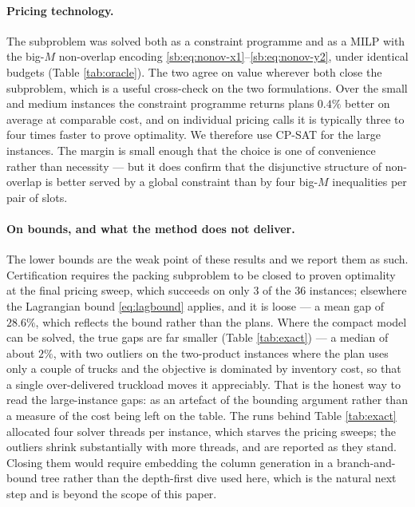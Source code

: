 \paragraph{Pricing technology.}
The subproblem was solved both as a constraint programme and as a MILP
with the big-$M$ non-overlap encoding
\eqref{sb:eq:nonov-x1}--\eqref{sb:eq:nonov-y2}, under identical
budgets (Table \ref{tab:oracle}). The two agree on value wherever both
close the subproblem, which is a useful cross-check on the two
formulations. Over the small and medium instances the constraint
programme returns plans $0.4\%$ better on average at comparable cost,
and on individual pricing calls it is typically three to four times
faster to prove optimality. We therefore use CP-SAT for the large
instances. The margin is small enough that the choice is one of
convenience rather than necessity --- but it does confirm that the
disjunctive structure of non-overlap is better served by a global
constraint than by four big-$M$ inequalities per pair of slots.

\paragraph{On bounds, and what the method does not deliver.}
The lower bounds are the weak point of these results and we report
them as such. Certification requires the packing subproblem to be
closed to proven optimality at the final pricing sweep, which succeeds
on only 3 of the 36 instances; elsewhere the Lagrangian bound
\eqref{eq:lagbound} applies, and it is loose --- a mean gap of
$28.6\%$, which reflects the bound rather than the plans. Where the
compact model can be solved, the true gaps are far smaller (Table
\ref{tab:exact}) --- a median of about $2\%$, with two outliers on the
two-product instances where the plan uses only a couple of trucks and
the objective is dominated by inventory cost, so that a single
over-delivered truckload moves it appreciably. That is the honest way
to read the large-instance gaps: as an artefact of the bounding
argument rather than a measure of the cost being left on the table.
The runs behind Table \ref{tab:exact} allocated four solver threads
per instance, which starves the pricing sweeps; the outliers shrink
substantially with more threads, and are reported as they stand. Closing them would require
embedding the column generation in a branch-and-bound tree rather than
the depth-first dive used here, which is the natural next step and is
beyond the scope of this paper.

